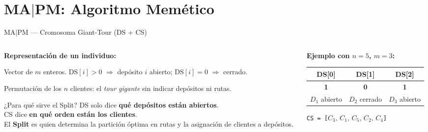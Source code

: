 \documentclass[aspectratio=169,10pt]{beamer}
\begin{document}
\section{MA$|$PM: Algoritmo Memético}

\begin{frame}{MA$|$PM --- Cromosoma Giant-Tour (DS + CS)}
  \begin{columns}[T,onlytextwidth]
    \begin{column}{0.50\textwidth}
      \textbf{Representación de un individuo:}
      \vspace{0.3em}
      \begin{description}\small
        \item[\textbf{DS (Depot State)}] Vector de $m$ enteros. DS$[i]>0$ $\Rightarrow$ depósito $i$ abierto; DS$[i]=0$ $\Rightarrow$ cerrado.
        \item[\textbf{CS (Client Sequence)}] Permutación de los $n$ clientes: el \textit{tour gigante} sin indicar depósitos ni rutas.
      \end{description}
      \vspace{0.4em}
      \begin{block}{¿Para qué sirve el Split?}\small
        DS solo dice \textbf{qué depósitos están abiertos}.\\
        CS dice \textbf{en qué orden están los clientes}.\\
        El \textbf{Split} es quien determina la partición óptima en rutas y la asignación de clientes a depósitos.
      \end{block}
    \end{column}
    \begin{column}{0.48\textwidth}
      \textbf{Ejemplo con $n=5$, $m=3$:}
      \vspace{0.3em}
      \begin{center}\footnotesize
      \begin{tabular}{ccc}
        \toprule
        DS[0] & DS[1] & DS[2] \\
        \midrule
        \textbf{1} & \textbf{0} & \textbf{1} \\
        $D_1$ abierto & $D_2$ cerrado & $D_3$ abierto \\
        \bottomrule
      \end{tabular}
      \end{center}
      \vspace{0.3em}
      \centering\texttt{CS = [$C_3,\,C_1,\,C_5,\,C_2,\,C_4$]}

\end{column}
\end{columns}
\end{frame}
\end{document}
